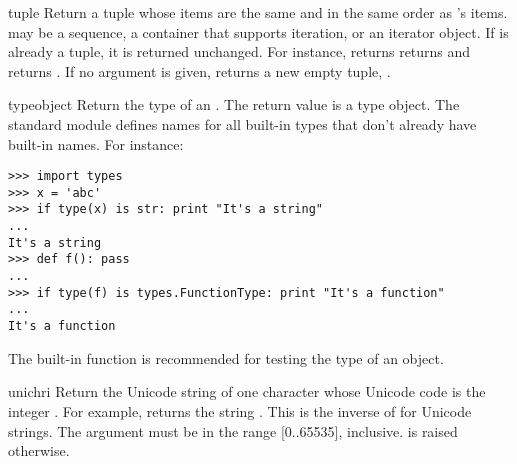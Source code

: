 \begin{funcdesc}{tuple}{}
  Return a tuple whose items are the same and in the same order as
  's items.   may be a sequence, a
  container that supports iteration, or an iterator object.
  If  is already a tuple, it
  is returned unchanged.  For instance,  returns
  returns  and  returns
  .  If no argument is given, returns a new empty
  tuple, \code{()}.
\end{funcdesc}

\begin{funcdesc}{type}{object}
  Return the type of an .  The return value is a
  type object.  The standard module
   defines names for all built-in
  types that don't already have built-in names.
  For instance:

\begin{verbatim}
>>> import types
>>> x = 'abc'
>>> if type(x) is str: print "It's a string"
...
It's a string
>>> def f(): pass
...
>>> if type(f) is types.FunctionType: print "It's a function"
...
It's a function
\end{verbatim}

  The  built-in function is recommended for
  testing the type of an object.
\end{funcdesc}

\begin{funcdesc}{unichr}{i}
  Return the Unicode string of one character whose Unicode code is the
  integer .  For example,  returns the string
  .  This is the inverse of  for Unicode
  strings.  The argument must be in the range [0..65535], inclusive.
   is raised otherwise.
\end{funcdesc}

